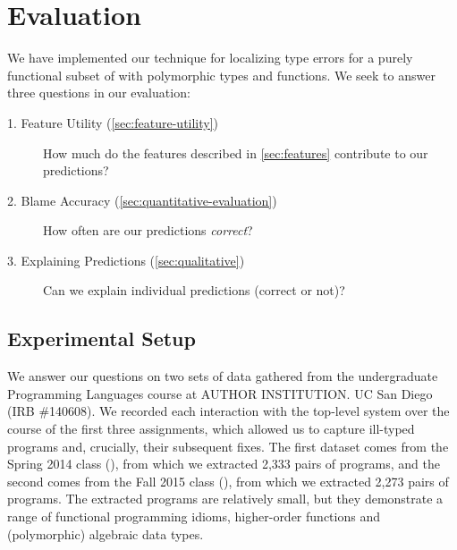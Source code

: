 \section{Evaluation}
\label{sec:evaluation}


We have implemented our technique for localizing type errors for a
purely functional subset of \ocaml with polymorphic types and functions.
%
We seek to answer three questions in our evaluation:
%
\begin{description}
\item[1. Feature Utility (\autoref{sec:feature-utility})]
  How much do the features described in \autoref{sec:features}
  contribute to our predictions?
\item[2. Blame Accuracy (\autoref{sec:quantitative-evaluation})]
  How often are our predictions \emph{correct}?
\item[3. Explaining Predictions (\autoref{sec:qualitative})]
  Can we explain individual predictions (correct or not)?
\end{description}

\subsection{Experimental Setup}
\label{sec:experimental-setup}

We answer our questions on two sets of data gathered from the
undergraduate Programming Languages course at
\if@anonymous
AUTHOR INSTITUTION.
\else
UC San Diego (IRB \#140608).
\fi
%
We recorded each interaction with the \ocaml top-level system over the
course of the first three assignments, which allowed us to capture
ill-typed programs and, crucially, their subsequent fixes.
%
The first dataset comes from the Spring 2014 class (\SPRING), from which
we extracted 2,333 pairs of programs, and the second comes from the Fall
2015 class (\FALL), from which we extracted 2,273 pairs of programs.
%
The extracted programs are relatively small, but they demonstrate a
range of functional programming idioms, \eg higher-order functions and
(polymorphic) algebraic data types.

